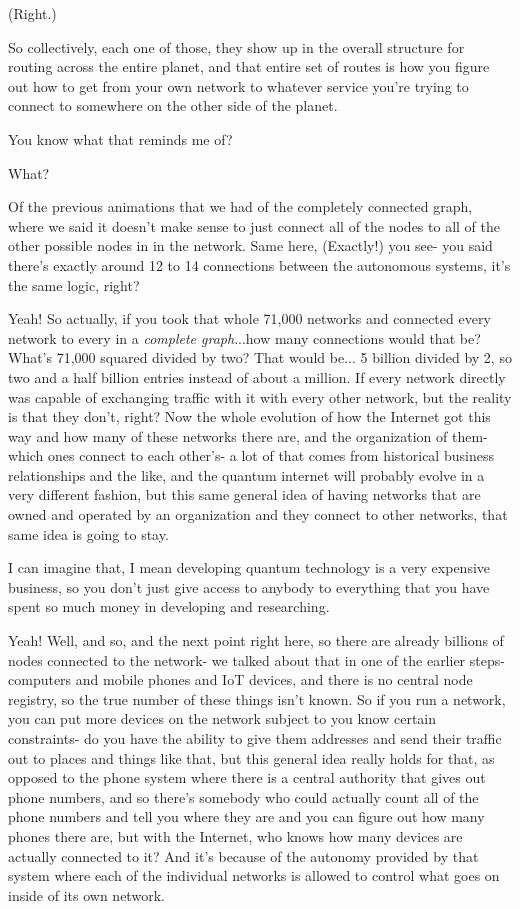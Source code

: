 \mmm (Right.)

\rrr So collectively, each one of those, they show up in the overall structure for routing across the entire planet, and that entire set of routes is how you figure out how to get from your own network to whatever service you're trying to connect to somewhere on the other side of the planet.

\mmm You know what that reminds me of? 

\rrr What?

\mmm Of the previous animations that we had of the completely connected graph, where we said it doesn't make sense to just connect all of the nodes to all of the other possible nodes in in the network. Same here, (Exactly!) you see- you said there's exactly around 12 to 14 connections between the autonomous systems, it's the same logic, right?

\rrr Yeah! So actually, if you took that whole 71,000 networks and connected every network to every in a \emph{complete graph}...how many connections would that be?  What's 71,000 squared divided by two? That would be... 5 billion divided by 2, so two and a half billion entries instead of about a million. If every network directly was capable of exchanging traffic with it with every other network, but the reality is that they don't, right? Now the whole evolution of how the Internet got this way and how many of these networks there are, and the organization of them- which ones connect to each other's- a lot of that comes from historical business relationships and the like, and the quantum internet will probably evolve in a very different fashion, but this same general idea of having networks that are owned and operated by an organization and they connect to other networks, that same idea is going to stay.

\mmm I can imagine that, I mean developing quantum technology is a very expensive business, so you don't just give access to anybody to everything that you have spent so much money in developing and researching.

\rrr Yeah! Well, and so, and the next point right here, so there are already billions of nodes connected to the network- we talked about that in one of the earlier steps- computers and mobile phones and IoT devices, and there is no central node registry, so the true number of these things isn't known. So if you run a network, you can put more devices on the network subject to you know certain constraints- do you have the ability to give them addresses and send their traffic out to places and things like that, but this general idea really holds for that, as opposed to the phone system where there is a central authority that gives out phone numbers, and so there's somebody who could actually count all of the phone numbers and tell you where they are and you can figure out how many phones there are, but with the Internet, who knows how many devices are actually connected to it? And it's because of the autonomy provided by that system where each of the individual networks is allowed to control what goes on inside of its own network.

